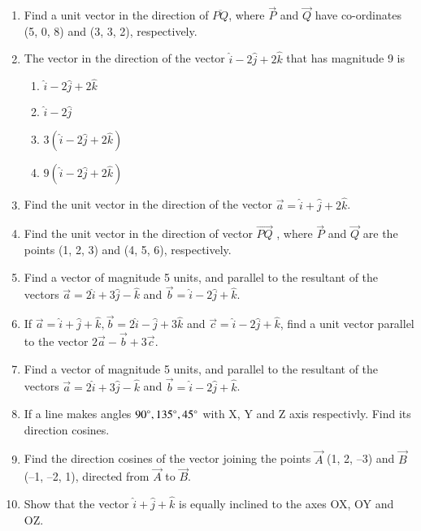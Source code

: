 \begin{enumerate}[label=\thesubsection.\arabic*, ref=\thesubsection.\theenumi]
\item Find a unit vector in the direction of $\overline{PQ} $,  where $\vec{P}$ and $\vec{Q}$ have co-ordinates (5, 0, 8) and (3, 3, 2), respectively.
\item The vector in the direction of the vector $\hat{i}-2\hat{j}+2\hat{k}$ that has magnitude 9 is
	\begin{enumerate}
\item $\hat{i}-2\hat{j}+2\hat{k}$
\item $\hat{i}-2\hat{j}$
\item $3(\hat{i}-2\hat{j}+2\hat{k})$
\item $9(\hat{i}-2\hat{j}+2\hat{k})$
\end{enumerate}
\item Find the unit vector in the direction of the vector $\vec{a}=\hat{i}+\hat{j}+2\hat{k}$.
\item Find the unit vector in the direction of vector $\overrightarrow{PQ}$ ,  where $\vec{P}$ and $\vec{Q}$ are the points
(1,  2,  3) and (4,  5,  6),  respectively.
\item Find a vector of magnitude 5 units,  and parallel to the resultant of the vectors $\vec{a}=2\hat{i}+3\hat{j}-\hat{k}$ and $\vec{b}=\hat{i}-2\hat{j}+\hat{k}$.\\
\item If $\vec{a}=\hat{i}+\hat{j}+\hat{k},  \vec{b}=2\hat{i}-\hat{j}+3\hat{k}$ and $\vec{c}=\hat{i}-2\hat{j}+\hat{k}$,  find a unit vector parallel to the vector $2\vec{a}-\vec{b}+3\vec{c}$.\\
	\solution
		
	\item 
Find a vector of magnitude 5 units,  and parallel to the resultant of the vectors $\vec{a} = 2\hat{i}+3\hat{j}-\hat{k}$ and $\vec{b} = \hat{i}-2\hat{j}+\hat{k}$.
\\
\solution
		
	\item If a line makes angles $90\degree, 135\degree, 45\degree$ with X, Y and Z axis respectivly. Find its direction cosines.
		\\
		\solution
		
\item Find the direction cosines of the vector joining the points $\vec{A}$ (1,  2,  –3) and
$\vec{B}$(–1,  –2,  1),  directed from $\vec{A}$ to $\vec{B}$.
	\\
    \solution 
		
\item Show that the vector $\hat{i}+\hat{j}+\hat{k}$ is equally inclined to the axes OX,  OY and OZ.

\end{enumerate}
